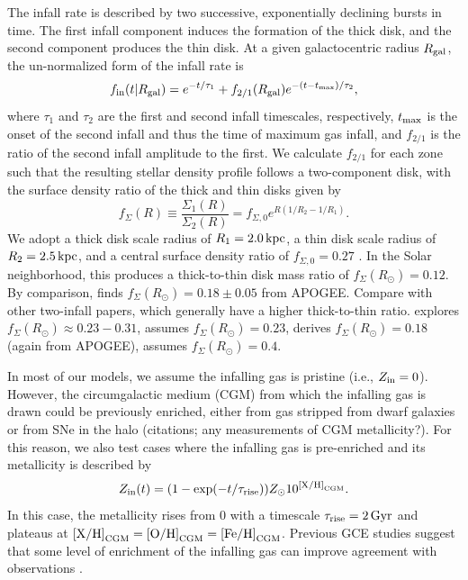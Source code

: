 \documentclass[twocolumn,twocolappendix,linenumbers]{aastex631}
\newcommand{\mathXH}{{\rm [X/H]}}
\newcommand{\mathOH}{{\rm [O/H]}}
\newcommand{\mathFeH}{{\rm [Fe/H]}}
\newcommand{\mathOFe}{{\rm [O/Fe]}}
\newcommand{\todo}[1]{{\color{red}#1}}
\begin{document}
The infall rate is described by two successive, exponentially declining bursts in time. The first infall component induces the formation of the thick disk, and the second component produces the thin disk. At a given galactocentric radius $R_{\rm gal}$, the un-normalized form of the infall rate is
\begin{equation}
    \label{eq:twoinfall-ifr}
    f_{\rm in}(t|R_{\rm gal}) = e^{-t/\tau_1} + f_{2/1}(R_{\rm gal}) e^{-(t-t_{\rm max})/\tau_2},
\end{equation}
where $\tau_1$ and $\tau_2$ are the first and second infall timescales, respectively, $t_{\rm max}$ is the onset of the second infall and thus the time of maximum gas infall, and $f_{2/1}$ is the ratio of the second infall amplitude to the first. We calculate $f_{2/1}$ for each zone such that the resulting stellar density profile follows a two-component disk, with the surface density ratio of the thick and thin disks given by
\begin{equation}
    f_\Sigma(R) \equiv \frac{\Sigma_1(R)}{\Sigma_2(R)} = f_{\Sigma,0} e^{R(1/R_2 - 1/R_1)}.
\end{equation}
We adopt a thick disk scale radius of $R_1=2.0\,{\rm kpc}$, a thin disk scale radius of $R_2=2.5\,{\rm kpc}$, and a central surface density ratio of $f_{\Sigma,0}=0.27$ \citep{bland-hawthorn_galaxy_2016}. In the Solar neighborhood, this produces a thick-to-thin disk mass ratio of $f_\Sigma(R_\odot)=0.12$. By comparison, \citet{mackereth_age-metallicity_2017} finds $f_\Sigma(R_\odot)=0.18\pm0.05$ from APOGEE. \todo{Compare with other two-infall papers, which generally have a higher thick-to-thin ratio.} \citet{spitoni_galactic_2020} explores $f_\Sigma(R_\odot)\approx0.23-0.31$, \citet{palla_chemical_2020} assumes $f_\Sigma(R_\odot)=0.23$, \citet{spitoni_apogee_2021} derives $f_\Sigma(R_\odot)=0.18$ (again from APOGEE), \citet{spitoni_remind_2024} assumes $f_\Sigma(R_\odot)=0.4$.

In most of our models, we assume the infalling gas is pristine (i.e., $Z_{\rm in}=0$). However, the circumgalactic medium (CGM) from which the infalling gas is drawn could be previously enriched, either from gas stripped from dwarf galaxies or from SNe in the halo \todo{(citations; any measurements of CGM metallicity?)}. For this reason, we also test cases where the infalling gas is pre-enriched and its metallicity is described by
\begin{equation}
    \label{eq:pre-enrichment}
    Z_{\rm in}(t) = (1 - \exp(-t/\tau_{\rm rise})) Z_\odot 10^{\mathXH_{\rm CGM}}.
\end{equation}
In this case, the metallicity rises from 0 with a timescale $\tau_{\rm rise}=2\,{\rm Gyr}$ and plateaus at $\mathXH_{\rm CGM}=\mathOH_{\rm CGM}=\mathFeH_{\rm CGM}$. Previous GCE studies suggest that some level of enrichment of the infalling gas can improve agreement with observations \citep[e.g.,][]{palla_chemical_2020,johnson_milky_2024,spitoni_remind_2024}.
\end{document}

